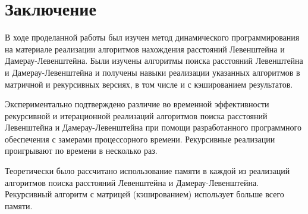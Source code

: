 \documentclass[12pt]{report}
\begin{document}
    \chapter*{Заключение}
    В ходе проделанной работы был изучен метод динамического программирования на материале реализации
    алгоритмов нахождения расстояний Левенштейна и Дамерау-Левенштейна.
    Были изучены алгоритмы поиска расстояний Левенштейна и Дамерау-Левенштейна и получены навыки
    реализации указанных алгоритмов в матричной и рекурсивных версиях, в том числе и с кэшированием результатов.

    Экспериментально подтверждено различие во временной эффективности рекурсивной и итерационной
    реализаций алгоритмов поиска расстояний Левенштейна и Дамерау-Левенштейна
    при помощи разработанного программного обеспечения с замерами процессорного времени.
    Рекурсивные реализации проигрывают по времени в несколько раз.

    Теоретически было рассчитано использование памяти в каждой из реализаций алгоритмов поиска
    расстояний Левенштейна и Дамерау-Левенштейна. Рекурсивный алгоритм с матрицей (кэшированием)
    использует больше всего памяти.

    \newpage

\end{document}
